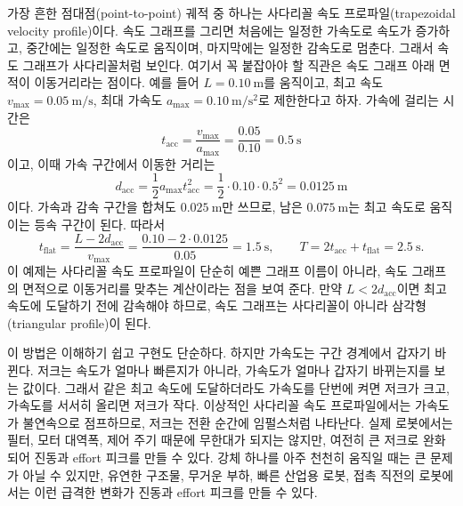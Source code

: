 가장 흔한 점대점(point-to-point) 궤적 중 하나는 사다리꼴 속도 프로파일(trapezoidal velocity profile)이다.
속도 그래프를 그리면 처음에는 일정한 가속도로 속도가 증가하고, 중간에는 일정한 속도로 움직이며, 마지막에는 일정한 감속도로 멈춘다.
그래서 속도 그래프가 사다리꼴처럼 보인다.
여기서 꼭 붙잡아야 할 직관은 속도 그래프 아래 면적이 이동거리라는 점이다.
예를 들어 \(L=0.10~\mathrm{m}\)를 움직이고, 최고 속도 \(v_{\max}=0.05~\mathrm{m/s}\), 최대 가속도 \(a_{\max}=0.10~\mathrm{m/s^2}\)로 제한한다고 하자.
가속에 걸리는 시간은
\begin{equation}
  t_{\mathrm{acc}}
  =
  \frac{v_{\max}}{a_{\max}}
  =
  \frac{0.05}{0.10}
  =
  0.5~\mathrm{s}
  \label{eq:trapezoid-accel-time}
\end{equation}
이고, 이때 가속 구간에서 이동한 거리는
\begin{equation}
  d_{\mathrm{acc}}
  =
  \frac{1}{2}a_{\max}t_{\mathrm{acc}}^2
  =
  \frac{1}{2}\cdot0.10\cdot0.5^2
  =
  0.0125~\mathrm{m}
  \label{eq:trapezoid-accel-distance}
\end{equation}
이다.
가속과 감속 구간을 합쳐도 \(0.025~\mathrm{m}\)만 쓰므로, 남은 \(0.075~\mathrm{m}\)는 최고 속도로 움직이는 등속 구간이 된다.
따라서
\begin{equation}
  t_{\mathrm{flat}}
  =
  \frac{L-2d_{\mathrm{acc}}}{v_{\max}}
  =
  \frac{0.10-2\cdot0.0125}{0.05}
  =
  1.5~\mathrm{s},
  \qquad
  T
  =
  2t_{\mathrm{acc}}+t_{\mathrm{flat}}
  =
  2.5~\mathrm{s}.
  \label{eq:trapezoid-total-time}
\end{equation}
이 예제는 사다리꼴 속도 프로파일이 단순히 예쁜 그래프 이름이 아니라, 속도 그래프의 면적으로 이동거리를 맞추는 계산이라는 점을 보여 준다.
만약 \(L<2d_{\mathrm{acc}}\)이면 최고 속도에 도달하기 전에 감속해야 하므로, 속도 그래프는 사다리꼴이 아니라 삼각형(triangular profile)이 된다.

이 방법은 이해하기 쉽고 구현도 단순하다.
하지만 가속도는 구간 경계에서 갑자기 바뀐다.
저크는 속도가 얼마나 빠른지가 아니라, 가속도가 얼마나 갑자기 바뀌는지를 보는 값이다.
그래서 같은 최고 속도에 도달하더라도 가속도를 단번에 켜면 저크가 크고, 가속도를 서서히 올리면 저크가 작다.
이상적인 사다리꼴 속도 프로파일에서는 가속도가 불연속으로 점프하므로, 저크는 전환 순간에 임펄스처럼 나타난다.
실제 로봇에서는 필터, 모터 대역폭, 제어 주기 때문에 무한대가 되지는 않지만, 여전히 큰 저크로 완화되어 진동과 effort 피크를 만들 수 있다.
강체 하나를 아주 천천히 움직일 때는 큰 문제가 아닐 수 있지만, 유연한 구조물, 무거운 부하, 빠른 산업용 로봇, 접촉 직전의 로봇에서는 이런 급격한 변화가 진동과 effort 피크를 만들 수 있다.

